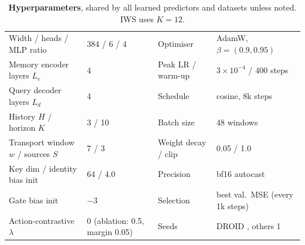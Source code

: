 \begin{table}[!htbp]
\centering\scriptsize
\caption{\textbf{Hyperparameters}, shared by all learned predictors and datasets unless noted. IWS uses $K{=}12$.}
\label{tab:hyper}
\begin{tabular}{@{}ll@{\hspace{2em}}ll@{}}
\toprule
Width / heads / MLP ratio & 384 / 6 / 4 & Optimiser & AdamW, $\beta{=}(0.9,0.95)$ \\
Memory encoder layers $L_e$ & 4 & Peak LR / warm-up & $3{\times}10^{-4}$ / 400 steps \\
Query decoder layers $L_d$ & 4 & Schedule & cosine, 8k steps \\
History $H$ / horizon $K$ & 3 / 10 & Batch size & 48 windows \\
Transport window $w$ / sources $S$ & 7 / 3 & Weight decay / clip & 0.05 / 1.0 \\
Key dim / identity bias init & 64 / 4.0 & Precision & bf16 autocast \\
Gate bias init & $-3$ & Selection & best val.\ MSE (every 1k steps) \\
Action-contrastive $\lambda$ & 0 (ablation: 0.5, margin 0.05) & Seeds & DROID \droidSeeds{}, others 1 \\
\bottomrule
\end{tabular}
\end{table}
